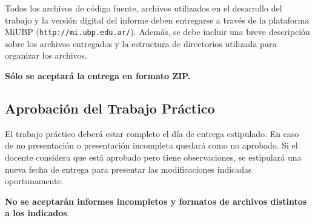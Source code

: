 \documentclass[a4paper,11pt]{article}
\begin{document}
Todos los archivos de código fuente, archivos utilizados en el
desarrollo del trabajo y la versi\'on digital del informe deben
entregarse a través de la plataforma MiUBP (\verb|http://mi.ubp.edu.ar/|).
Además, se debe incluir una breve descripción sobre los archivos entregados
y la estructura de directorios utilizada para organizar los archivos.

\textbf{Sólo se aceptará la entrega en formato ZIP.}


\subsection*{Aprobación del Trabajo Práctico}

El trabajo práctico deberá estar completo el día de entrega
estipulado.  En caso de no presentación o presentación incompleta
quedará como no aprobado.  Si el docente considera que está aprobado
pero tiene observaciones, se estipulará una nueva fecha de entrega
para presentar las modificaciones indicadas oportunamente.

\textbf{No se aceptarán informes incompletos y formatos de archivos
  distintos a los indicados}.
  

  

    

\end{document}
